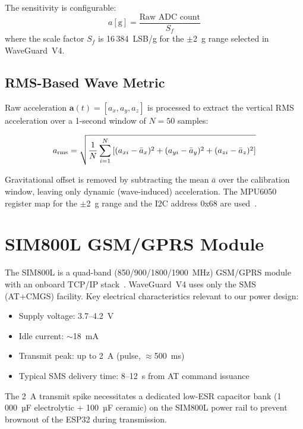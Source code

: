 The sensitivity is configurable:
\begin{equation}
  a [\textrm{g}] = \frac{\textrm{Raw ADC count}}{S_f}
  \label{eq:accel_scale}
\end{equation}
where the scale factor $S_f$ is 16\,384~LSB/g for the $\pm$2~g range selected in
WaveGuard~V4.

\subsection{RMS-Based Wave Metric}

Raw acceleration $\mathbf{a}(t) = [a_x, a_y, a_z]$ is processed to extract the
vertical RMS acceleration over a 1-second window of $N = 50$ samples:

\begin{equation}
  a_{\rm rms} = \sqrt{\frac{1}{N}\sum_{i=1}^{N}\left[(a_{xi}-\bar{a}_x)^2 +
    (a_{yi}-\bar{a}_y)^2 + (a_{zi}-\bar{a}_z)^2\right]}
  \label{eq:rms}
\end{equation}

Gravitational offset is removed by subtracting the mean $\bar{a}$ over the calibration
window, leaving only dynamic (wave-induced) acceleration.
The MPU6050 register map for the $\pm$2~g range and the I2C address 0x68 are
used~\cite{invensense2013mpu6050}.

\section{SIM800L GSM/GPRS Module}

The SIM800L is a quad-band (850/900/1800/1900~MHz) GSM/GPRS module with an onboard
TCP/IP stack~\cite{simcom2015sim800l}.
WaveGuard~V4 uses only the SMS (AT+CMGS) facility.
Key electrical characteristics relevant to our power design:

\begin{itemize}
  \item Supply voltage: 3.7--4.2~V
  \item Idle current: $\sim$18~mA
  \item Transmit peak: up to 2~A (pulse, $\approx$500~ms)
  \item Typical SMS delivery time: 8--12~s from AT command issuance
\end{itemize}

The 2~A transmit spike necessitates a dedicated low-ESR capacitor bank (1\,000~µF
electrolytic + 100~µF ceramic) on the SIM800L power rail to prevent brownout of the
ESP32 during transmission.

